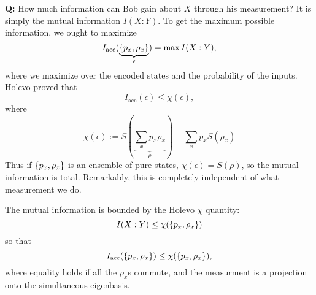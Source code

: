 \textbf{Q:} How much information can Bob gain about $X$ through his measurement? It is simply the mutual information $I(X:Y)$. To get the maximum possible information, we ought to maximize
\begin{equation}
    I_\text{acc}(\underbrace{\{p_x,\rho_x\}}_\epsilon) = \max I(X:Y),
\end{equation}
where we maximize over the encoded states and the probability of the inputs. Holevo proved that
\begin{equation}
    I_\text{acc}(\epsilon) \leq \chi(\epsilon),
\end{equation}
where
\begin{equation}
    \chi(\epsilon):= S(\underbrace{\sum_x p_x \rho_x}_\rho) - \sum_x p_x S(\rho_x)
\end{equation}
Thus if $\{p_x,\rho_x\}$ is an ensemble of pure states, $\chi(\epsilon)=S(\rho)$, so the mutual information is total. Remarkably, this is completely independent of what measurement we do.
\begin{thm}
    The mutual information is bounded by the Holevo $\chi$ quantity:
    \begin{equation}
        I(X:Y)\leq \chi(\{p_x,\rho_x\})
    \end{equation}
    so that
    \begin{equation}
        I_\text{acc}(\{p_x,\rho_x\})\leq \chi(\{p_x,\rho_x\}),
    \end{equation}
    where equality holds if all the $\rho_x$s commute, and the measurment is a projection onto the simultaneous eigenbasis.
\end{thm}
